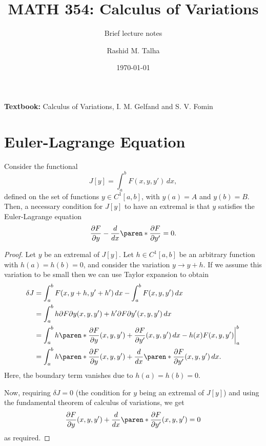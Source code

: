 \documentclass[11pt]{penrose}
\title{MATH 354: Calculus of Variations}
\subtitle{Brief lecture notes}
\author{Rashid M. Talha}
\affiliation{School of Natural Sciences, NUST}
\date{\today}
\begin{document}
\maketitle

\textbf{Textbook:} Calculus of Variations, I. M. Gelfand and S. V. Fomin

\section{Euler-Lagrange Equation}
\begin{nthm}
    Consider the functional
    \begin{equation}
        J[y] = \int_{a}^{b} F(x, y, y') \,dx,
    \end{equation}
    defined on the set of functions $y \in C^{1}[a,b]$, with $y(a) = A$ and $y(b) = B$. Then, a necessary condition for $J[y]$ to have an extremal is that $y$ satisfies the Euler-Lagrange equation
    \begin{equation}
        \frac{\pd F}{\pd y} - \frac{d}{dx} \paren*{\frac{\pd F}{\pd y'}} = 0.
        \label{eq:el-basic}
    \end{equation}
\end{nthm}
\begin{proof}
    Let $y$ be an extremal of $J[y]$. Let $h \in C^1 [a,b]$ be an arbitrary function with $h(a)=h(b)=0$, and consider the variation $y \to y+h$. If we assume this variation to be small then we can use Taylor expansion to obtain
    \begin{align}
        \delta J
        &= \int_{a}^{b} F(x, y+h, y'+h') \,dx - \int_{a}^{b} F(x, y, y') \,dx\\
        &= \int_{a}^{b} h {\pd F}{\pd y}(x, y, y') + h' {\pd F}{\pd y'}(x, y, y') \,dx\\
        &= \int_{a}^{b} h \paren*{ \frac{\pd F}{\pd y}(x, y, y') + \frac{\pd F}{\pd y'}(x, y, y') } \,dx - \bigg. h(x) F(x, y, y') \bigg|_a^b\\
        &= \int_{a}^{b} h \paren*{ \frac{\pd F}{\pd y}(x, y, y') + \frac{d}{dx} \paren*{ \frac{\pd F}{\pd y'}(x, y, y')} } \,dx.
    \end{align}
    Here, the boundary term vanishes due to $h(a)=h(b)=0$.

    Now, requiring $\delta J = 0$ (the condition for $y$ being an extremal of $J[y]$) and using the fundamental theorem of calculus of variations, we get
    \begin{equation}
        \frac{\pd F}{\pd y}(x, y, y') + \frac{d}{dx} \paren*{ \frac{\pd F}{\pd y'}(x, y, y')} = 0
    \end{equation}
    as required.
\end{proof}
\end{document}
